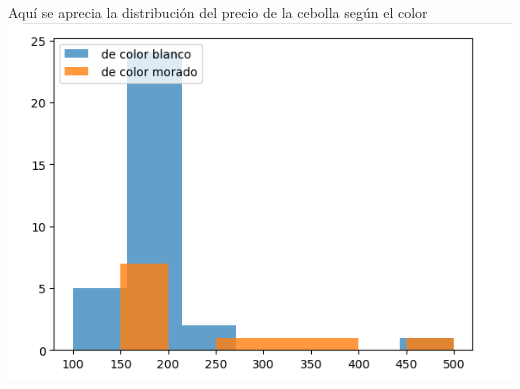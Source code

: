 \documentclass{beamer}
\begin{document}
 \begin{frame}
    Aquí se aprecia la distribución del precio de la cebolla según el color
    \includegraphics[scale=0.5]{precio por color cebolla.png}
    \end{frame}   
\end{document}
